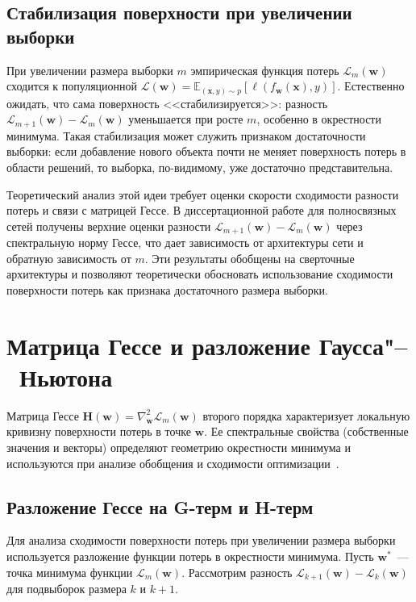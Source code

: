 \subsection{Стабилизация поверхности при увеличении выборки}

При увеличении размера выборки $m$ эмпирическая функция потерь $\mathcal{L}_m(\mathbf{w})$ сходится к популяционной $\mathcal{L}(\mathbf{w}) = \mathbb{E}_{(\mathbf{x},y) \sim p}[\ell(f_{\mathbf{w}}(\mathbf{x}), y)]$. Естественно ожидать, что сама поверхность <<стабилизируется>>: разность $\mathcal{L}_{m+1}(\mathbf{w}) - \mathcal{L}_m(\mathbf{w})$ уменьшается при росте $m$, особенно в окрестности минимума. Такая стабилизация может служить признаком достаточности выборки: если добавление нового объекта почти не меняет поверхность потерь в области решений, то выборка, по-видимому, уже достаточно представительна.

Теоретический анализ этой идеи требует оценки скорости сходимости разности потерь и связи с матрицей Гессе. В диссертационной работе для полносвязных сетей получены верхние оценки разности $\mathcal{L}_{m+1}(\mathbf{w}) - \mathcal{L}_m(\mathbf{w})$ через спектральную норму Гессе, что дает зависимость от архитектуры сети и обратную зависимость от $m$. Эти результаты обобщены на сверточные архитектуры и позволяют теоретически обосновать использование сходимости поверхности потерь как признака достаточного размера выборки.

\section{Матрица Гессе и разложение Гаусса"--~Ньютона}

Матрица Гессе $\mathbf{H}(\mathbf{w}) = \nabla^2_{\mathbf{w}} \mathcal{L}_m(\mathbf{w})$ второго порядка характеризует локальную кривизну поверхности потерь в точке $\mathbf{w}$. Ее спектральные свойства (собственные значения и векторы) определяют геометрию окрестности минимума и используются при анализе обобщения и сходимости оптимизации~\cite{papyan2019spectrum}.

\subsection{Разложение Гессе на G-терм и H-терм}

Для анализа сходимости поверхности потерь при увеличении размера выборки используется разложение функции потерь в окрестности минимума. Пусть $\mathbf{w}^*$~--- точка минимума функции $\mathcal{L}_m(\mathbf{w})$. Рассмотрим разность $\mathcal{L}_{k+1}(\mathbf{w}) - \mathcal{L}_k(\mathbf{w})$ для подвыборок размера $k$ и $k+1$.

